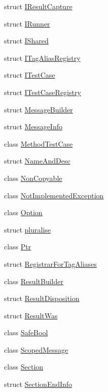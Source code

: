 \begin{DoxyCompactItemize}
\item 
struct \hyperlink{struct_catch_1_1_i_result_capture}{I\+Result\+Capture}
\item 
struct \hyperlink{struct_catch_1_1_i_runner}{I\+Runner}
\item 
struct \hyperlink{struct_catch_1_1_i_shared}{I\+Shared}
\item 
struct \hyperlink{struct_catch_1_1_i_tag_alias_registry}{I\+Tag\+Alias\+Registry}
\item 
struct \hyperlink{struct_catch_1_1_i_test_case}{I\+Test\+Case}
\item 
struct \hyperlink{struct_catch_1_1_i_test_case_registry}{I\+Test\+Case\+Registry}
\item 
struct \hyperlink{struct_catch_1_1_message_builder}{Message\+Builder}
\item 
struct \hyperlink{struct_catch_1_1_message_info}{Message\+Info}
\item 
class \hyperlink{class_catch_1_1_method_test_case}{Method\+Test\+Case}
\item 
struct \hyperlink{struct_catch_1_1_name_and_desc}{Name\+And\+Desc}
\item 
class \hyperlink{class_catch_1_1_non_copyable}{Non\+Copyable}
\item 
class \hyperlink{class_catch_1_1_not_implemented_exception}{Not\+Implemented\+Exception}
\item 
class \hyperlink{class_catch_1_1_option}{Option}
\item 
struct \hyperlink{struct_catch_1_1pluralise}{pluralise}
\item 
class \hyperlink{class_catch_1_1_ptr}{Ptr}
\item 
struct \hyperlink{struct_catch_1_1_registrar_for_tag_aliases}{Registrar\+For\+Tag\+Aliases}
\item 
class \hyperlink{class_catch_1_1_result_builder}{Result\+Builder}
\item 
struct \hyperlink{struct_catch_1_1_result_disposition}{Result\+Disposition}
\item 
struct \hyperlink{struct_catch_1_1_result_was}{Result\+Was}
\item 
class \hyperlink{class_catch_1_1_safe_bool}{Safe\+Bool}
\item 
class \hyperlink{class_catch_1_1_scoped_message}{Scoped\+Message}
\item 
class \hyperlink{class_catch_1_1_section}{Section}
\item 
struct \hyperlink{struct_catch_1_1_section_end_info}{Section\+End\+Info}

\end{DoxyCompactItemize}
